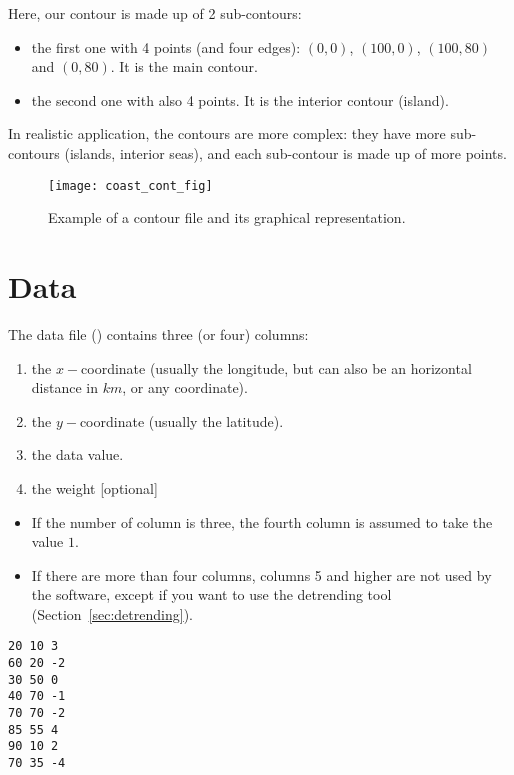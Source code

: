 Here, our contour is made up of 2 sub-contours: 
\begin{itemize}
\item the first one with 4 points (and four edges): $(0,0)$, $(100,0)$, $(100,80)$ and $(0,80)$. It is the main contour.
\item the second one with also 4 points. It is the interior contour (island).
\end{itemize}
In realistic application, the contours are more complex: they have more sub-contours (islands, interior seas), and each sub-contour is made up of more points. 

\begin{figure}[H]
\centering 
\texttt{[image: coast\_cont\_fig]}
\caption{Example of a contour file and its graphical representation.}
\end{figure}

\section{Data}

The data file () contains three (or four) columns: 
\begin{enumerate}
\item the $x-$coordinate (usually the longitude, but can also be an horizontal distance in $km$, or any coordinate).
\item the $y-$coordinate (usually the latitude).
\item the data value.
\item the weight [optional] 
\end{enumerate}
\begin{itemize}
\item If the number of column is three, the fourth column is assumed to take the value $1$. 
\item If there are more than four columns, columns 5 and higher are not used by the software, except if you want to use the detrending tool (Section~\ref{sec:detrending}). 
\end{itemize}

\begin{exfile}[htpb]
\begin{footnotesize}
\texttt{20 10 3\\
60 20 -2\\
30 50 0\\
40 70 -1\\
70 70 -2\\
85 55 4\\
90 10 2\\
70 35 -4} 
\end{footnotesize}
\caption{data.dat\label{ex:data.dat}}
\end{exfile}


